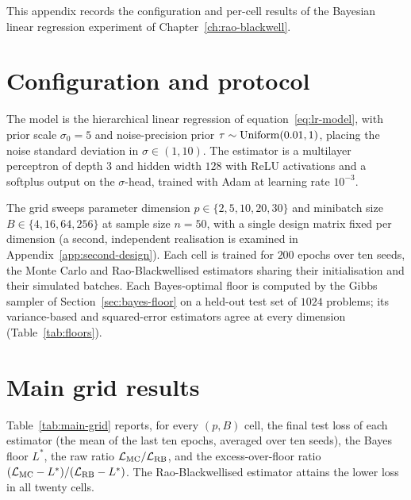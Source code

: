This appendix records the configuration and per-cell results of the
Bayesian linear regression experiment of
Chapter~\ref{ch:rao-blackwell}.

\section{Configuration and protocol}
\label{app:config}

The model is the hierarchical linear regression of
equation~\eqref{eq:lr-model}, with prior scale $\sigma_0 = 5$ and
noise-precision prior $\tau \sim \mathrm{Uniform}(0.01, 1)$, placing the noise
standard deviation in $\sigma \in (1, 10)$. The estimator is a
multilayer perceptron of depth $3$ and hidden width $128$ with ReLU
activations and a softplus output on the $\sigma$-head, trained with
Adam at learning rate $10^{-3}$.

The grid sweeps parameter dimension $p \in \{2, 5, 10, 20, 30\}$ and
minibatch size $B \in \{4, 16, 64, 256\}$ at sample size $n = 50$, with
a single design matrix fixed per dimension (a second, independent
realisation is examined in Appendix~\ref{app:second-design}). Each cell
is trained for $200$ epochs over ten seeds, the Monte Carlo and
Rao-Blackwellised estimators sharing their initialisation and their
simulated batches.
Each Bayes-optimal floor is computed by the Gibbs sampler of
Section~\ref{sec:bayes-floor} on a held-out test set of $1024$
problems; its variance-based and squared-error estimators agree at
every dimension (Table~\ref{tab:floors}).

\section{Main grid results}
\label{app:main-grid}

Table~\ref{tab:main-grid} reports, for every $(p, B)$ cell, the final
test loss of each estimator (the mean of the last ten epochs, averaged
over ten seeds), the Bayes floor $L^{*}$, the raw ratio
$\mathcal{L}_{\mathrm{MC}}/\mathcal{L}_{\mathrm{RB}}$, and the excess-over-floor ratio
$(\mathcal{L}_{\mathrm{MC}}-L^{*})/(\mathcal{L}_{\mathrm{RB}}-L^{*})$. The
Rao-Blackwellised estimator attains the lower loss in all twenty cells.


